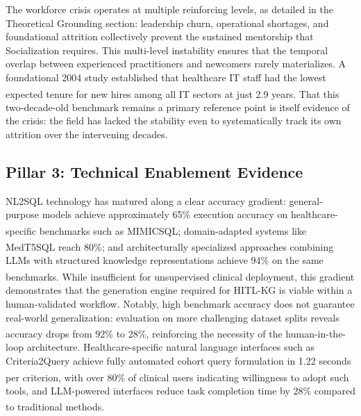 \documentclass[
  american,
  11pt,
  letterpaper,
  oneside  ,captions=tableheading
]{scrartcl}
\begin{document}
The workforce crisis operates at multiple reinforcing levels, as
detailed in the Theoretical Grounding section: leadership churn,
operational shortages, and foundational attrition collectively prevent
the sustained mentorship that Socialization requires. This multi-level
instability ensures that the temporal overlap between experienced
practitioners and newcomers rarely materializes. A foundational 2004
study established that healthcare IT staff had the lowest expected
tenure for new hires among all IT sectors at just 2.9
years\textsuperscript{}. That this
two-decade-old benchmark remains a primary reference point is itself
evidence of the crisis: the field has lacked the stability even to
systematically track its own attrition over the intervening decades.

\subsection{Pillar 3: Technical Enablement
Evidence}\label{pillar-3-technical-enablement-evidence}

NL2SQL technology has matured along a clear accuracy gradient:
general-purpose models achieve approximately 65\% execution accuracy on
healthcare-specific benchmarks such as
MIMICSQL\textsuperscript{};
domain-adapted systems like MedT5SQL reach
80\%\textsuperscript{}; and
architecturally specialized approaches combining LLMs with structured
knowledge representations achieve 94\% on the same
benchmarks\textsuperscript{}. While
insufficient for unsupervised clinical
deployment\textsuperscript{}, this
gradient demonstrates that the generation engine required for HITL-KG is
viable within a human-validated workflow. Notably, high benchmark
accuracy does not guarantee real-world generalization: evaluation on
more challenging dataset splits reveals accuracy drops from 92\% to
28\%\textsuperscript{}, reinforcing the
necessity of the human-in-the-loop architecture. Healthcare-specific
natural language interfaces such as Criteria2Query achieve fully
automated cohort query formulation in 1.22 seconds per
criterion\textsuperscript{}, with over 80\%
of clinical users indicating willingness to adopt such tools, and
LLM-powered interfaces reduce task completion time by 28\% compared to
traditional methods\textsuperscript{}.
\end{document}
